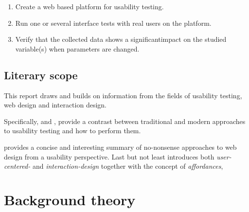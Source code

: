 \documentclass[nofilelist,dvipsnames]{cslthse-msc}
\begin{document}
		\begin{enumerate}
			\item{Create a web based platform for usability testing.}
			\item{Run one or several interface tests with real users on the platform.}
			\item{
				Verify that the collected data shows a significant\checkTruth impact on the studied
				variable(s) when parameters are changed. 
			}
		\end{enumerate}

	\section{Literary scope}

		This report draws and builds on information from the fields of usability
		testing, web design and interaction design.

		Specifically,  and
		, provide a contrast between
		traditional and modern approaches to usability testing and how to perform
		them.

		 provides a concise and interesting
		summary of no-nonsense approaches to web design from a usability perspective.
		Last but not least  introduces
		both \textit{user-centered-} and \textit{interaction-design} together
		with the concept of \textit{affordances},



	\chapter{Background theory}
\end{document}
